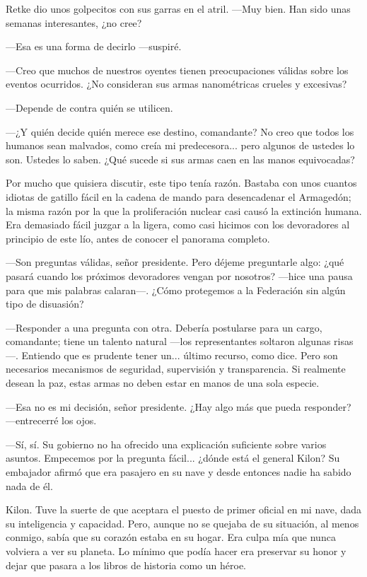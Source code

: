 Retke dio unos golpecitos con sus garras en el atril. —Muy bien. Han sido unas semanas interesantes, ¿no cree?

—Esa es una forma de decirlo —suspiré.

—Creo que muchos de nuestros oyentes tienen preocupaciones válidas sobre los eventos ocurridos. ¿No consideran sus armas nanométricas crueles y excesivas?

—Depende de contra quién se utilicen.

 —¿Y quién decide quién merece ese destino, comandante? No creo que todos los humanos sean malvados, como creía mi predecesora... pero algunos de ustedes lo son. Ustedes lo saben. ¿Qué sucede si sus armas caen en las manos equivocadas?

Por mucho que quisiera discutir, este tipo tenía razón. Bastaba con unos cuantos idiotas de gatillo fácil en la cadena de mando para desencadenar el Armagedón; la misma razón por la que la proliferación nuclear casi causó la extinción humana. Era demasiado fácil juzgar a la ligera, como casi hicimos con los devoradores al principio de este lío, antes de conocer el panorama completo.

—Son preguntas válidas, señor presidente. Pero déjeme preguntarle algo: ¿qué pasará cuando los próximos devoradores vengan por nosotros? —hice una pausa para que mis palabras calaran—. ¿Cómo protegemos a la Federación sin algún tipo de disuasión?

—Responder a una pregunta con otra. Debería postularse para un cargo, comandante; tiene un talento natural —los representantes soltaron algunas risas—. Entiendo que es prudente tener un... último recurso, como dice. Pero son necesarios mecanismos de seguridad, supervisión y transparencia. Si realmente desean la paz, estas armas no deben estar en manos de una sola especie.

—Esa no es mi decisión, señor presidente. ¿Hay algo más que pueda responder? —entrecerré los ojos.

—Sí, sí. Su gobierno no ha ofrecido una explicación suficiente sobre varios asuntos. Empecemos por la pregunta fácil... ¿dónde está el general Kilon? Su embajador afirmó que era pasajero en su nave y desde entonces nadie ha sabido nada de él.

Kilon. Tuve la suerte de que aceptara el puesto de primer oficial en mi nave, dada su inteligencia y capacidad. Pero, aunque no se quejaba de su situación, al menos conmigo, sabía que su corazón estaba en su hogar. Era culpa mía que nunca volviera a ver su planeta. Lo mínimo que podía hacer era preservar su honor y dejar que pasara a los libros de historia como un héroe.


